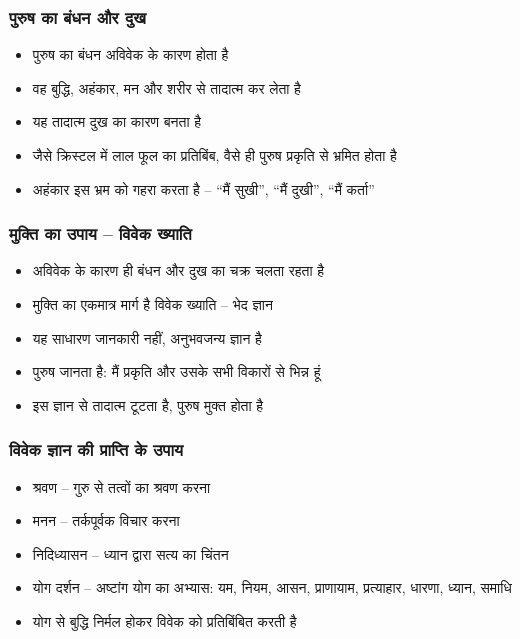 \begin{frame}[fragile]\frametitle{पुरुष का बंधन और दुख}
\begin{itemize}
  \item पुरुष का बंधन अविवेक के कारण होता है
  \item वह बुद्धि, अहंकार, मन और शरीर से तादात्म कर लेता है
  \item यह तादात्म दुख का कारण बनता है
  \item जैसे क्रिस्टल में लाल फूल का प्रतिबिंब, वैसे ही पुरुष प्रकृति से भ्रमित होता है
  \item अहंकार इस भ्रम को गहरा करता है – “मैं सुखी”, “मैं दुखी”, “मैं कर्ता”
\end{itemize}
\end{frame}

\begin{frame}[fragile]\frametitle{मुक्ति का उपाय – विवेक ख्याति}
\begin{itemize}
  \item अविवेक के कारण ही बंधन और दुख का चक्र चलता रहता है
  \item मुक्ति का एकमात्र मार्ग है विवेक ख्याति – भेद ज्ञान
  \item यह साधारण जानकारी नहीं, अनुभवजन्य ज्ञान है
  \item पुरुष जानता है: मैं प्रकृति और उसके सभी विकारों से भिन्न हूं
  \item इस ज्ञान से तादात्म टूटता है, पुरुष मुक्त होता है
\end{itemize}
\end{frame}

\begin{frame}[fragile]\frametitle{विवेक ज्ञान की प्राप्ति के उपाय}
\begin{itemize}
  \item श्रवण – गुरु से तत्वों का श्रवण करना
  \item मनन – तर्कपूर्वक विचार करना
  \item निदिध्यासन – ध्यान द्वारा सत्य का चिंतन
  \item योग दर्शन – अष्टांग योग का अभ्यास: यम, नियम, आसन, प्राणायाम, प्रत्याहार, धारणा, ध्यान, समाधि
  \item योग से बुद्धि निर्मल होकर विवेक को प्रतिबिंबित करती है
\end{itemize}
\end{frame}

